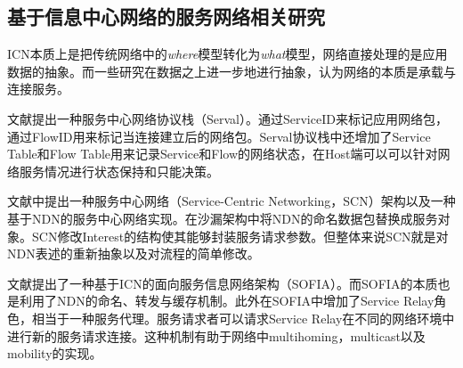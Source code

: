 \subsection{基于信息中心网络的服务网络相关研究}
ICN本质上是把传统网络中的\textit{where}模型转化为\textit{what}模型，网络直接处理的是应用数据的抽象。而一些研究在数据之上进一步地进行抽象，认为网络的本质是承载与连接服务。

文献\cite{nordstrom2012serval}提出一种服务中心网络协议栈（Serval）。通过ServiceID来标记应用网络包，通过FlowID用来标记当连接建立后的网络包。Serval协议栈中还增加了Service Table和Flow Table用来记录Service和Flow的网络状态，在Host端可以可以针对网络服务情况进行状态保持和只能决策。

文献\cite{braun2011service,braun2013service}中提出一种服务中心网络（Service-Centric Networking，SCN）架构以及一种基于NDN的服务中心网络实现。在沙漏架构中将NDN的命名数据包替换成服务对象。SCN修改Interest的结构使其能够封装服务请求参数。但整体来说SCN就是对NDN表述的重新抽象以及对流程的简单修改。

文献\cite{wu2014sofia}提出了一种基于ICN的面向服务信息网络架构（SOFIA）。而SOFIA的本质也是利用了NDN的命名、转发与缓存机制。此外在SOFIA中增加了Service Relay角色，相当于一种服务代理。服务请求者可以请求Service Relay在不同的网络环境中进行新的服务请求连接。这种机制有助于网络中multihoming，multicast以及mobility的实现。
